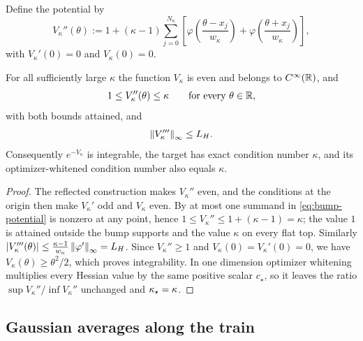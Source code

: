 Define the potential by
\begin{equation}\label{eq:bump-potential}
    V_\kappa''(\theta)
    :=1+(\kappa-1)\sum_{j=0}^{N_\kappa}
    \left[\varphi\left(\frac{\theta-x_j}{w_\kappa}\right)
         +\varphi\left(\frac{\theta+x_j}{w_\kappa}\right)\right],
\end{equation}
with $V_\kappa'(0)=0$ and $V_\kappa(0)=0$.

\begin{lemma}\label{lem:bump-regularity}
    For all sufficiently large $\kappa$ the function $V_\kappa$ is even and belongs to
    $C^\infty(\mathbb{R})$, and
    \begin{equation}\label{eq:bump-curvature-bounds}
        1\leq V_\kappa''(\theta)\leq\kappa
        \qquad\text{for every }\theta\in\mathbb{R},
    \end{equation}
    with both bounds attained, and
    \begin{equation}\label{eq:bump-Hess-Lip}
        \left\lVert V_\kappa'''\right\rVert_\infty\leq L_H .
    \end{equation}
    Consequently $e^{-V_\kappa}$ is integrable, the target has exact condition number $\kappa$,
    and its optimizer-whitened condition number also equals $\kappa$.
\end{lemma}

\begin{proof}
    The reflected construction makes $V_\kappa''$ even, and the conditions at the origin then
    make $V_\kappa'$ odd and $V_\kappa$ even. By  at most one summand in
    \eqref{eq:bump-potential} is nonzero at any point, hence
    $1\leq V_\kappa''\leq1+(\kappa-1)=\kappa$; the value $1$ is attained outside the bump
    supports and the value $\kappa$ on every flat top. Similarly
    $|V_\kappa'''(\theta)|\leq\tfrac{\kappa-1}{w_\kappa}\left\lVert \varphi'\right\rVert_\infty=L_H$. Since
    $V_\kappa''\geq1$ and $V_\kappa(0)=V_\kappa'(0)=0$, we have
    $V_\kappa(\theta)\geq\theta^2/2$, which proves integrability. In one dimension optimizer
    whitening multiplies every Hessian value by the same positive scalar $c_\star$, so it
    leaves the ratio $\sup V_\kappa''/\inf V_\kappa''$ unchanged and $\kappa_\star=\kappa$.
\end{proof}

\subsection{Gaussian averages along the train}

